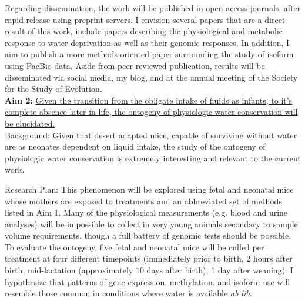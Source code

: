 \documentclass[11pt]{article}
\begin{document}
Regarding dissemination, the work will be published in open access journals, after rapid release using preprint servers. I envision several papers that are a direct result of this work, include papers describing the physiological and metabolic response to water deprivation as well as their genomic responses. In addition, I aim to publish a more methods-oriented paper surrounding the study of isoform using PacBio data. Aside from peer-reviewed publication, results will be disseminated via social media, my blog, and at the annual meeting of the Society for the Study of Evolution. \\       

%
%
%
%





\noindent \textbf{Aim 2:} \ul{Given the transition from the obligate intake of fluids as infants, to it’s complete absence later in life, the ontogeny of physiologic water conservation will be elucidated.} \\

Background: Given that desert adapted mice, capable of surviving without water are as neonates dependent on liquid intake, {the study of the ontogeny of physiologic water conservation is extremely interesting and relevant to the current work.} 

Research Plan: This phenomenon will be explored using fetal and neonatal mice whose mothers are exposed to treatments and an abbreviated set of methods listed in Aim 1. Many of the physiological measurements  (e.g. blood and urine analyses) will be impossible to collect in very young animals secondary to sample volume requirements, though a full battery of genomic tests should be possible. To evaluate the ontogeny, five fetal and neonatal mice will be culled per treatment at four different timepoints (immediately prior to birth, 2 hours after birth, mid-lactation (approximately 10 days after birth), 1 day after weaning). I hypothesize that patterns of gene expression, methylation, and isoform use will resemble those common in conditions where water is available \textit{ab lib}. \\
\end{document}
